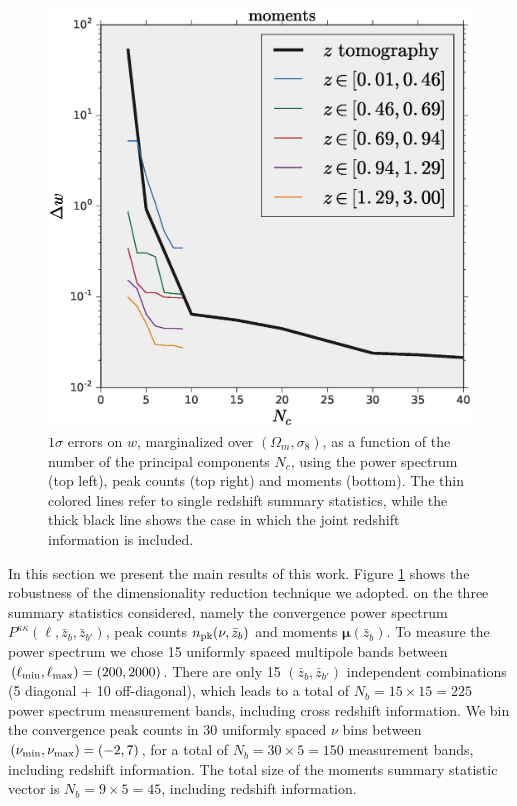\documentclass[reprint,aps,prd,superscriptaddress,showkeys,showpacs]{revtex4-1}
\begin{document}
\begin{figure}
\includegraphics[scale=0.3]{Figures/w_moments_pca.eps}
\caption{$1\sigma$ errors on $w$, marginalized over $(\Omega_m,\sigma_8)$, as a function of the number of the principal components $N_c$, using the power spectrum (top left), peak counts (top right) and moments (bottom). The thin colored lines refer to single redshift summary statistics, while the thick black line shows the case in which the joint redshift information is included.}
\label{fig:pcacomponents}
\end{figure}

In this section we present the main results of this work. Figure \ref{fig:pcacomponents} shows the robustness of the dimensionality reduction technique we adopted. on the three summary statistics considered, namely the convergence power spectrum $P^{\kappa\kappa}(\ell,\bar{z}_b,\bar{z}_{b'})$, peak counts $n_{\rm pk}(\nu,\bar{z}_b)$ and moments $\pmb{\mu}(\bar{z}_b)$. To measure the power spectrum we chose 15 uniformly spaced multipole bands between $(\ell_{\rm min},\ell_{\rm max})=(200,2000)$. There are only 15 $(\bar{z}_b,\bar{z}_{b'})$ independent combinations (5 diagonal + 10 off-diagonal), which leads to a total of $N_b=15\times 15=225$ power spectrum measurement bands, including cross redshift information. 
We bin the convergence peak counts in 30 uniformly spaced $\nu$ bins between $(\nu_{\rm min},\nu_{\rm max})=(-2,7)$, for a total of $N_b=30\times5=150$ measurement bands, including redshift information. The total size of the moments summary statistic vector is $N_b=9\times 5=45$, including redshift information. 
\end{document}
